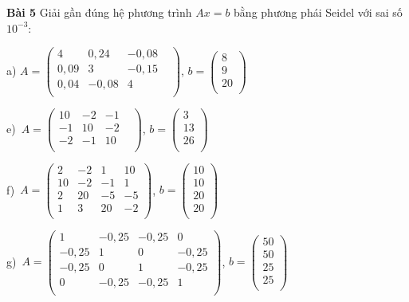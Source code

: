 \textbf{Bài 5} Giải gần đúng hệ phương trình $Ax=b$ bằng phương phái Seidel với sai số $10^{-3}$:\par

a) $A= \begin{pmatrix}
4&0,24&-0,08&\\
0,09&3&-0,15&\\
0,04&-0,08&4&\\
\end{pmatrix}$, $b= \begin{pmatrix}
8\\
9\\
20\\
\end{pmatrix}$\par

e)~$A= \begin{pmatrix}
10&-2&-1&\\
-1&10&-2&\\
-2&-1&10&\\
\end{pmatrix}$, $b= \begin{pmatrix}
3\\
13\\
26\\
\end{pmatrix}$\par

f)~$A=\begin{pmatrix}	
2&-2&1&10\\	
10&-2&-1&1\\	
2&20&-5&-5\\	
1&3&20&-2\\	
\end{pmatrix}$, $b=\begin{pmatrix}
10\\
10\\
20\\
20\\
\end{pmatrix}$\par

g)~$A=\begin{pmatrix}
1&-0,25&-0,25&0\\
-0,25&1&0&-0,25\\
-0,25&0&1&-0,25\\
0&-0,25&-0,25&1\\
\end{pmatrix}$, $b=\begin{pmatrix}
50\\
50\\
25\\
25\\
\end{pmatrix}$\par

